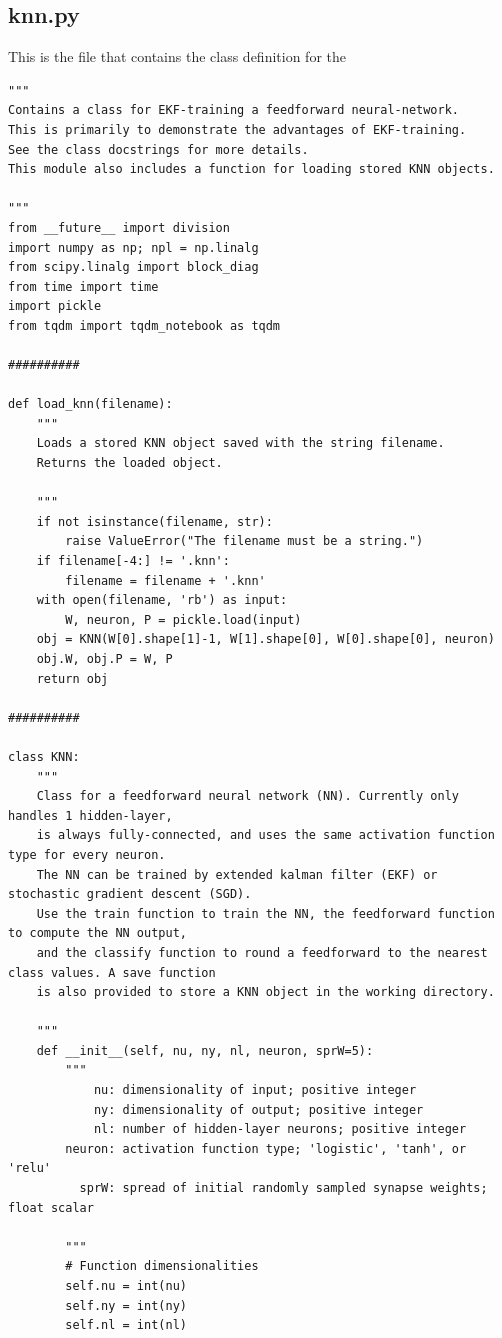 \documentclass{article}
\begin{document}
\subsection{knn.py}
This is the file that contains the class definition for the 
\begin{verbatim}
"""
Contains a class for EKF-training a feedforward neural-network.
This is primarily to demonstrate the advantages of EKF-training.
See the class docstrings for more details.
This module also includes a function for loading stored KNN objects.

"""
from __future__ import division
import numpy as np; npl = np.linalg
from scipy.linalg import block_diag
from time import time
import pickle
from tqdm import tqdm_notebook as tqdm

##########

def load_knn(filename):
    """
    Loads a stored KNN object saved with the string filename.
    Returns the loaded object.

    """
    if not isinstance(filename, str):
        raise ValueError("The filename must be a string.")
    if filename[-4:] != '.knn':
        filename = filename + '.knn'
    with open(filename, 'rb') as input:
        W, neuron, P = pickle.load(input)
    obj = KNN(W[0].shape[1]-1, W[1].shape[0], W[0].shape[0], neuron)
    obj.W, obj.P = W, P
    return obj

##########

class KNN:
    """
    Class for a feedforward neural network (NN). Currently only handles 1 hidden-layer,
    is always fully-connected, and uses the same activation function type for every neuron.
    The NN can be trained by extended kalman filter (EKF) or stochastic gradient descent (SGD).
    Use the train function to train the NN, the feedforward function to compute the NN output,
    and the classify function to round a feedforward to the nearest class values. A save function
    is also provided to store a KNN object in the working directory.

    """
    def __init__(self, nu, ny, nl, neuron, sprW=5):
        """
            nu: dimensionality of input; positive integer
            ny: dimensionality of output; positive integer
            nl: number of hidden-layer neurons; positive integer
        neuron: activation function type; 'logistic', 'tanh', or 'relu'
          sprW: spread of initial randomly sampled synapse weights; float scalar

        """
        # Function dimensionalities
        self.nu = int(nu)
        self.ny = int(ny)
        self.nl = int(nl)


\end{verbatim}
\end{document}
